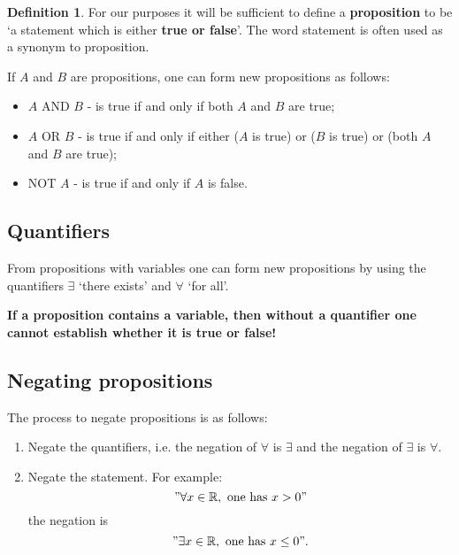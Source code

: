 \documentclass[12pt, a4paper]{article}
\newcommand{\bb}[1]{\mathbb{#1}}
\theoremstyle{definition}
\newtheorem{definition}{Definition}[section]
\theoremstyle{plain}
\begin{document}
\begin{definition}
For our purposes it will be sufficient to define a \textbf{proposition} to be ‘a statement which is either \textbf{true or false}’. The word statement is often used as a synonym to proposition.
\end{definition}

If $A$ and $B$ are propositions, one can form new propositions as follows:

\begin{itemize}

	\item $A$ AND $B$ - is true if and only if both $A$ and $B$ are true;

	\item $A$ OR $B$ - is true if and only if either ($A$ is true) or ($B$ is true) or (both $A$ and $B$ are true);

	\item NOT $A$ - is true if and only if $A$ is false.

\end{itemize}

\subsection{Quantifiers}

From propositions with variables one can form new propositions by using the quantifiers $\exists$ ‘there exists’ and $\forall$ ‘for all’.

\begin{tcolorbox}
\textbf{If a proposition contains a variable, then without a quantifier one cannot establish whether it is true or false!}
\end{tcolorbox}

\subsection{Negating propositions}

The process to negate propositions is as follows: 

\begin{enumerate}
	
	\item Negate the quantifiers, i.e. the negation of $\forall$ is $\exists$ and the negation of $\exists$ is $\forall.$

	\item Negate the statement. For example:
	$$"\forall x \in \bb{R}, \text{ one has } x>0"$$ the negation is $$"\exists x \in \bb{R}, \text{ one has } x\leq0".$$

\end{enumerate}
\end{document}
